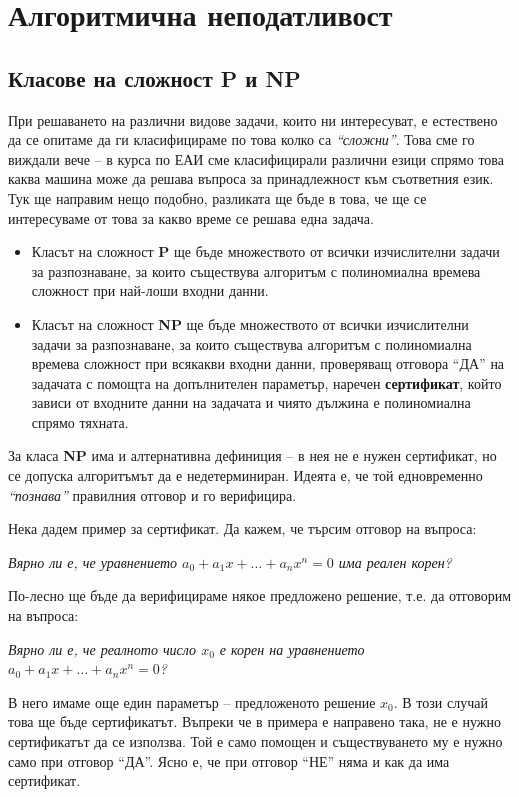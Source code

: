 
\chapter{Алгоритмична неподатливост}

\section{Класове на сложност \textbf{P} и \textbf{NP}}

При решаването на различни видове задачи, които ни интересуват, е естествено да се опитаме да ги класифицираме по това колко са \textit{``сложни''}.
Това сме го виждали вече -- в курса по ЕАИ сме класифицирали различни езици спрямо това каква машина може да решава въпроса за принадлежност към съответния език.
Тук ще направим нещо подобно, разликата ще бъде в това, че ще се интересуваме от това за какво време се решава една задача.
\begin{itemize}
      \item Класът на сложност \textbf{P} ще бъде множеството от всички изчислителни задачи за разпознаване, за които съществува алгоритъм с полиномиална времева сложност при най-лоши входни данни.
      \item Класът на сложност \textbf{NP} ще бъде множеството от всички изчислителни задачи за разпознаване, за които съществува алгоритъм с полиномиална времева сложност при всякакви входни данни, проверяващ отговора ``ДА'' на задачата с помощта на допълнителен параметър, наречен \textbf{сертификат}, който зависи от входните данни на задачата и чиято дължина е полиномиална спрямо тяхната.
\end{itemize}

\begin{remark}
      За класа \textbf{NP} има и алтернативна дефиниция -- в нея не е нужен сертификат, но се допуска алгоритъмът да е недетерминиран.
      Идеята е, че той едновременно \textit{``познава''} правилния отговор и го верифицира.
\end{remark}

\newpage

Нека дадем пример за сертификат.
Да кажем, че търсим отговор на въпроса:
\begin{center}
      \textit{Вярно ли е, че уравнението $a_0 + a_1 x + \dots + a_n x^n = 0$ има реален корен?}
\end{center}
По-лесно ще бъде да верифицираме някое предложено решение, т.е. да отговорим на въпроса:
\begin{center}
      \textit{Вярно ли е, че реалното число $x_0$ е корен на уравнението $a_0 + a_1 x + \dots + a_n x^n = 0$?}
\end{center}
В него имаме още един параметър -- предложеното решение $x_0$.
В този случай това ще бъде сертификатът.
Въпреки че в примера е направено така, не е нужно сертификатът да се използва.
Той е само помощен и съществуването му е нужно само при отговор ``ДА''.
Ясно е, че при отговор ``НЕ'' няма и как да има сертификат.

